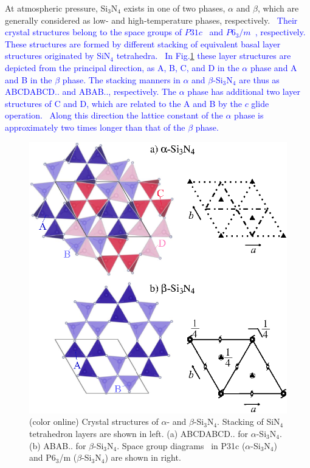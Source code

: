 \documentclass[twocolumn,amsmath,amssymb,a4paper,prb,superscriptaddress,floatfix]{revtex4-1}
\begin{document}
At atmospheric pressure, Si$_3$N$_4$ exists in one of two phases, $\alpha$ and
$\beta$, which are generally considered as low- and high-temperature phases,
respectively.~\cite{zhou,hirosaki,riley} \textcolor {blue}{Their crystal structures belong to the
	space groups of $P31c$~\cite{yashima} and $P6_3/m$~\cite{boulay}, respectively. These structures are formed by
different stacking of equivalent basal layer structures originated by SiN$_4$
tetrahedra.~\cite{hampshire} In Fig.\ref{fig:Fig1_cryst}  these layer structures are depicted from
the principal direction, as A, B, C, and D in the $\alpha$ phase and A and B in
the $\beta$ phase. The stacking manners in $\alpha$ and $\beta$-Si$_3$N$_4$ are
thus as ABCDABCD.. and ABAB.., respectively. 
The $\alpha$ phase has additional two layer structures of C and D, which are related to the A and B by
the $c$ glide operation.~\cite{hampshire} Along this direction the lattice constant of the $\alpha$ phase is
approximately two times longer than that of the $\beta$ phase.}
\begin{figure}[ht]
 \begin{center}
  \includegraphics[width=0.90\linewidth]{Fig1_crystal_str2.eps} \caption{(color
  online) Crystal structures of $\alpha$- and $\beta$-Si$_3$N$_4$. Stacking of
  SiN$_4$ tetrahedron layers are shown in left. (a) ABCDABCD.. for
  $\alpha$-Si$_3$N$_4$. (b) ABAB.. for $\beta$-Si$_3$N$_4$.  Space group
  diagrams~\cite{inttableA} in P31c ($\alpha$-Si$_3$N$_4$) and P6$_3$/m ($\beta$-Si$_3$N$_4$)
  are shown in right.}
  \label{fig:Fig1_cryst} 
 \end{center}
\end{figure}
\end{document}
